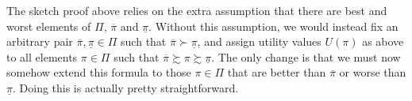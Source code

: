 The sketch proof above relies on the extra assumption that there are best and worst elements of $\Pi$, $\overline{\pi}$ and $\underline{\pi}$. Without this assumption, we would instead fix an arbitrary pair $\overline{\pi},\underline{\pi} \in \Pi$ such that $\overline{\pi} \succ \underline{\pi}$, and assign utility values $U(\pi)$ as above to all elements $\pi \in \Pi$ such that $\overline{\pi} \succsim \pi \succsim \underline{\pi}$. The only change is that we must now somehow extend this formula to those $\pi \in \Pi$ that are better than $\overline{\pi}$ or worse than $\underline{\pi}$. Doing this is actually pretty straightforward.

